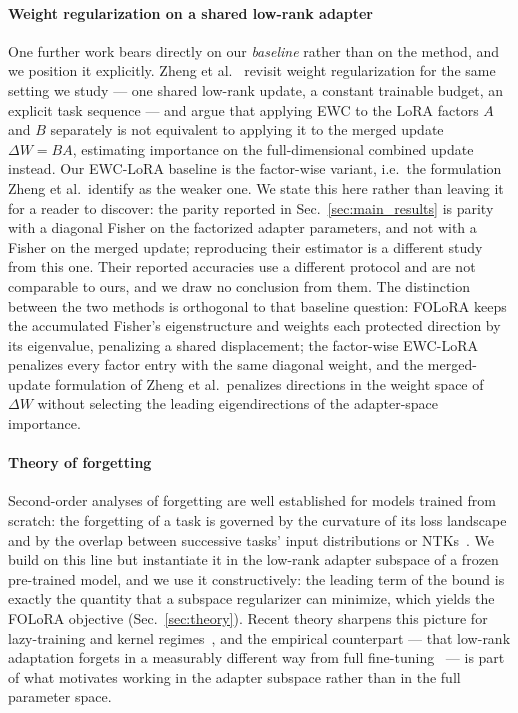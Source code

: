\paragraph{Weight regularization on a shared low-rank adapter}
One further work bears directly on our \emph{baseline} rather than on the method, and we
position it explicitly. Zheng et al.~\cite{zheng2026revisiting} revisit weight
regularization for the same setting we study --- one shared low-rank update, a constant
trainable budget, an explicit task sequence --- and argue that applying EWC to the LoRA
factors $A$ and $B$ separately is not equivalent to applying it to the merged update
$\Delta W = BA$, estimating importance on the full-dimensional combined update instead. Our
EWC-LoRA baseline is the factor-wise variant, i.e.\ the formulation Zheng et al.\ identify
as the weaker one. We state this here rather than leaving it for a reader to discover: the
parity reported in Sec.~\ref{sec:main_results} is parity with a diagonal Fisher on the
factorized adapter parameters, and not with a Fisher on the merged update; reproducing their
estimator is a different study from this one. Their reported accuracies use a different
protocol and are not comparable to ours, and we draw no conclusion from them. The
distinction between the two methods is orthogonal to that baseline question: FOLoRA keeps
the accumulated Fisher's eigenstructure and weights each protected direction by its
eigenvalue, penalizing a shared displacement; the factor-wise EWC-LoRA penalizes every
factor entry with the same diagonal weight, and the merged-update formulation of Zheng et
al.\ penalizes directions in the weight space of $\Delta W$ without selecting the leading
eigendirections of the adapter-space importance.

\paragraph{Theory of forgetting}
Second-order analyses of forgetting are well established for models trained from scratch:
the forgetting of a task is governed by the curvature of its loss landscape and by the
overlap between successive tasks' input distributions or NTKs~\cite{nguyen2019toward,
evron2022catastrophic,karakida2022learning,doan2021theoretical}. We build on this line
but instantiate it in the low-rank adapter subspace of a frozen pre-trained model, and we
use it constructively: the leading term of the bound is exactly the quantity that a
subspace regularizer can minimize, which yields the FOLoRA objective
(Sec.~\ref{sec:theory}). Recent theory sharpens this picture for lazy-training and kernel
regimes~\cite{graldi2025lazy,zheng2026ntk}, and the empirical counterpart --- that
low-rank adaptation forgets in a measurably different way from full
fine-tuning~\cite{shuttleworth2025intruder} --- is part of what motivates working in the
adapter subspace rather than in the full parameter space.


